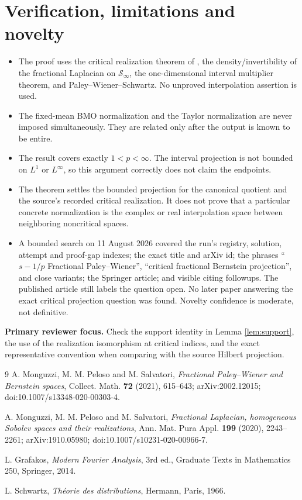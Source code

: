 \documentclass[11pt]{article}
\newcommand{\cS}{\mathcal S}
\begin{document}
\section{Verification, limitations and novelty}

\begin{itemize}
\item The proof uses the critical realization theorem of
\cite{MPSReal}, the density/invertibility of the fractional Laplacian on
$\cS_\infty$, the one-dimensional interval multiplier theorem, and
Paley--Wiener--Schwartz. No unproved interpolation assertion is used.
\item The fixed-mean BMO normalization and the Taylor normalization are never
imposed simultaneously. They are related only after the output is known to be
entire.
\item The result covers exactly $1<p<\infty$. The interval projection is not
bounded on $L^1$ or $L^\infty$, so this argument correctly does not claim the
endpoints.
\item The theorem settles the bounded projection for the canonical quotient
and the source's recorded critical realization. It does not prove that a
particular concrete normalization is the complex or real interpolation space
between neighboring noncritical spaces.
\item A bounded search on 11 August 2026 covered the run's registry, solution,
attempt and proof-gap indexes; the exact title and arXiv id; the phrases
``$s-1/p$ Fractional Paley--Wiener'', ``critical fractional Bernstein
projection'', and close variants; the Springer article; and visible citing
followups. The published article still labels the question open. No later
paper answering the exact critical projection question was found. Novelty
confidence is moderate, not definitive.
\end{itemize}

\noindent\textbf{Primary reviewer focus.} Check the support identity in Lemma
\ref{lem:support}, the use of the realization isomorphism at critical indices,
and the exact representative convention when comparing with the source
Hilbert projection.

\begin{thebibliography}{9}
A. Monguzzi, M. M. Peloso and M. Salvatori,
\emph{Fractional Paley--Wiener and Bernstein spaces}, Collect. Math.
\textbf{72} (2021), 615--643; arXiv:2002.12015;
doi:10.1007/s13348-020-00303-4.

A. Monguzzi, M. M. Peloso and M. Salvatori,
\emph{Fractional Laplacian, homogeneous Sobolev spaces and their
realizations}, Ann. Mat. Pura Appl. \textbf{199} (2020), 2243--2261;
arXiv:1910.05980; doi:10.1007/s10231-020-00966-7.

L. Grafakos, \emph{Modern Fourier Analysis}, 3rd ed., Graduate Texts in
Mathematics 250, Springer, 2014.

L. Schwartz, \emph{Th\'eorie des distributions}, Hermann, Paris, 1966.
\end{thebibliography}
\end{document}
